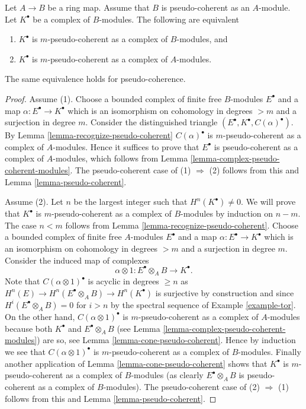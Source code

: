 \begin{lemma}
\label{lemma-finite-push-pseudo-coherent}
Let $A \to B$ be a ring map. Assume that $B$ is pseudo-coherent as an
$A$-module. Let $K^\bullet$ be a complex of $B$-modules.
The following are equivalent
\begin{enumerate}
\item $K^\bullet$ is $m$-pseudo-coherent
as a complex of $B$-modules, and
\item $K^\bullet$ is $m$-pseudo-coherent
as a complex of $A$-modules.
\end{enumerate}
The same equivalence holds for pseudo-coherence.
\end{lemma}

\begin{proof}
Assume (1). Choose a bounded complex of finite free $B$-modules
$E^\bullet$ and a map $\alpha : E^\bullet \to K^\bullet$ which is
an isomorphism on cohomology in degrees $> m$ and a surjection in degree $m$.
Consider the distinguished triangle
$(E^\bullet, K^\bullet, C(\alpha)^\bullet)$. By
Lemma \ref{lemma-recognize-pseudo-coherent}
$C(\alpha)^\bullet$ is $m$-pseudo-coherent as a complex of
$A$-modules. Hence it suffices to prove that $E^\bullet$ is
pseudo-coherent as a complex of $A$-modules, which follows from
Lemma \ref{lemma-complex-pseudo-coherent-modules}.
The pseudo-coherent case of (1) $\Rightarrow$ (2) follows from this and
Lemma \ref{lemma-pseudo-coherent}.

\medskip\noindent
Assume (2). Let $n$ be the largest integer such that $H^n(K^\bullet) \not = 0$.
We will prove that $K^\bullet$ is $m$-pseudo-coherent as a complex
of $B$-modules by induction on $n - m$. The case $n < m$ follows from
Lemma \ref{lemma-recognize-pseudo-coherent}.
Choose a bounded complex of finite free $A$-modules $E^\bullet$ and a
map $\alpha : E^\bullet \to K^\bullet$ which is an isomorphism on
cohomology in degrees $> m$ and a surjection in degree $m$.
Consider the induced map of complexes
$$
\alpha \otimes 1 : E^\bullet \otimes_A B \to K^\bullet.
$$
Note that $C(\alpha \otimes 1)^\bullet$ is acyclic in degrees
$\geq n$ as $H^n(E) \to H^n(E^\bullet \otimes_A B) \to H^n(K^\bullet)$
is surjective by construction and since $H^i(E^\bullet \otimes_A B) = 0$
for $i > n$ by the spectral sequence of
Example \ref{example-tor}.
On the other hand, $C(\alpha \otimes 1)^\bullet$
is $m$-pseudo-coherent as a complex of $A$-modules because
both $K^\bullet$ and $E^\bullet \otimes_A B$ (see
Lemma \ref{lemma-complex-pseudo-coherent-modules})
are so, see
Lemma \ref{lemma-cone-pseudo-coherent}.
Hence by induction we see that $C(\alpha \otimes 1)^\bullet$
is $m$-pseudo-coherent as a complex of $B$-modules. Finally
another application of
Lemma \ref{lemma-cone-pseudo-coherent}
shows that $K^\bullet$ is $m$-pseudo-coherent as a complex of $B$-modules
(as clearly $E^\bullet \otimes_A B$ is pseudo-coherent as a complex
of $B$-modules). The pseudo-coherent case
of (2) $\Rightarrow$ (1) follows from this and
Lemma \ref{lemma-pseudo-coherent}.
\end{proof}